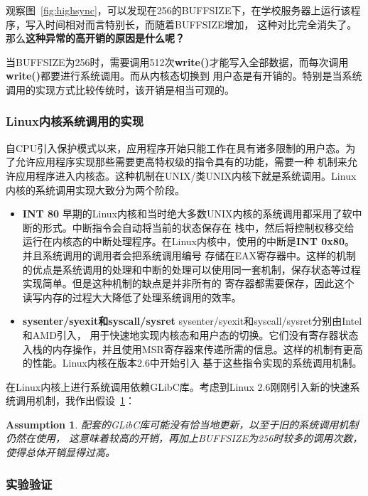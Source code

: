 \documentclass[a4paper,twoside]{article}
\newtheorem{assumption}{Assumption}[section]
\begin{document}
\begin{spacing}{1.2}
观察图~\ref{fig:highsync}，可以发现在256的BUFFSIZE下，在学校服务器上运行该程序，写入时间相对而言特别长，而随着BUFFSIZE增加，
这种对比完全消失了。那么\textbf{这种异常的高开销的原因是什么呢？}

当BUFFSIZE为256时，需要调用512次\textbf{write()}才能写入全部数据，而每次调用\textbf{write()}都要进行系统调用。而从内核态切换到
用户态是有开销的。特别是当系统调用的实现方式比较传统时，该开销是相当可观的。

\subsubsection{Linux内核系统调用的实现}

自CPU引入保护模式以来，应用程序开始只能工作在具有诸多限制的用户态。为了允许应用程序实现那些需要更高特权级的指令具有的功能，需要一种
机制来允许应用程序进入内核态。这种机制在UNIX/类UNIX内核下就是系统调用。Linux内核的系统调用实现大致分为两个阶段。

\begin{itemize}
	\item \textbf{INT 80}  早期的Linux内核和当时绝大多数UNIX内核的系统调用都采用了软中断的形式。中断指令会自动将当前的状态保存在
	栈中，然后将控制权移交给运行在内核态的中断处理程序。在Linux内核中，使用的中断是\textbf{INT 0x80}。并且系统调用的调用者会把系统调用编号
	存储在EAX寄存器中。这样的机制的优点是系统调用的处理和中断的处理可以使用同一套机制，保存状态等过程实现简单。但是这种机制的缺点是并非所有的
	寄存器都需要保存，因此这个读写内存的过程大大降低了处理系统调用的效率。

	\item \textbf{sysenter/syexit和syscall/sysret}  sysenter/syexit和syscall/sysret分别由Intel\cite{guide2011intel}和AMD\cite{amd2018amd64}引入，
	用于快速地实现内核态和用户态的切换。它们没有寄存器状态入栈的内存操作，并且使用MSR寄存器来传递所需的信息。这样的机制有更高的性能。Linux内核在版本2.6中开始引入
	基于这些指令实现的系统调用机制。
\end{itemize}

在Linux内核上进行系统调用依赖GLibC库。考虑到Linux 2.6刚刚引入新的快速系统调用机制，我作出假设~\ref{ass:syscall}：

\begin{assumption}
	\label{ass:syscall}
	配套的GLibC库可能没有恰当地更新，以至于旧的系统调用机制仍然在使用，
	这意味着较高的开销，再加上BUFFSIZE为256时较多的调用次数，使得总体开销显得过高。
\end{assumption}

\subsubsection{实验验证}


\end{spacing}
\end{document}
